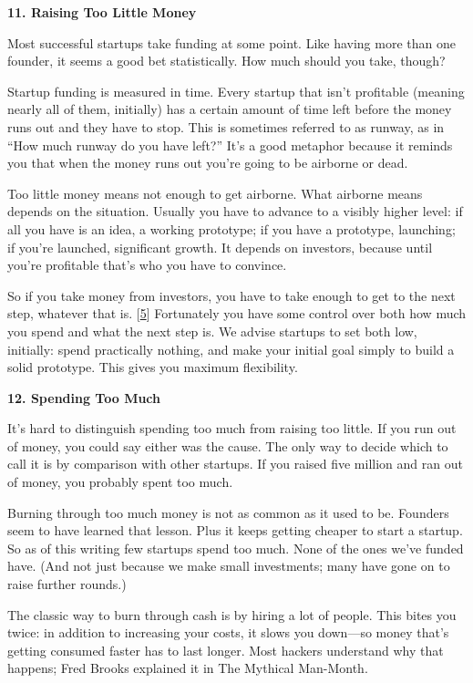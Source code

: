 \textbf{11. Raising Too Little Money}

Most successful startups take funding at some point. Like having more
than one founder, it seems a good bet statistically. How much should you
take, though?

Startup funding is measured in time. Every startup that isn't profitable
(meaning nearly all of them, initially) has a certain amount of time
left before the money runs out and they have to stop. This is sometimes
referred to as runway, as in ``How much runway do you have left?'' It's
a good metaphor because it reminds you that when the money runs out
you're going to be airborne or dead.

Too little money means not enough to get airborne. What airborne means
depends on the situation. Usually you have to advance to a visibly
higher level: if all you have is an idea, a working prototype; if you
have a prototype, launching; if you're launched, significant growth. It
depends on investors, because until you're profitable that's who you
have to convince.

So if you take money from investors, you have to take enough to get to
the next step, whatever that is. {[}\hyperref[f5n]{5}{]} Fortunately you
have some control over both how much you spend and what the next step
is. We advise startups to set both low, initially: spend practically
nothing, and make your initial goal simply to build a solid prototype.
This gives you maximum flexibility.

\textbf{12. Spending Too Much}

It's hard to distinguish spending too much from raising too little. If
you run out of money, you could say either was the cause. The only way
to decide which to call it is by comparison with other startups. If you
raised five million and ran out of money, you probably spent too much.

Burning through too much money is not as common as it used to be.
Founders seem to have learned that lesson. Plus it keeps getting cheaper
to start a startup. So as of this writing few startups spend too much.
None of the ones we've funded have. (And not just because we make small
investments; many have gone on to raise further rounds.)

The classic way to burn through cash is by hiring a lot of people. This
bites you twice: in addition to increasing your costs, it slows you
down---so money that's getting consumed faster has to last longer. Most
hackers understand why that happens; Fred Brooks explained it in The
Mythical Man-Month.


